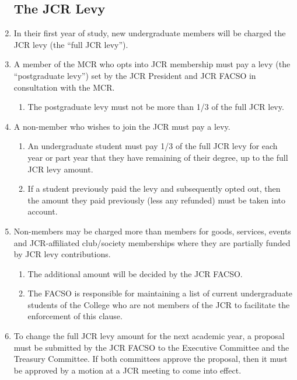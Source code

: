 \documentclass[12pt]{article}
\begin{document}
\begin{enumerate}
    \subsection{The JCR Levy}
    \item In their first year of study, new undergraduate members will be charged the JCR levy (the ``full JCR levy'').
    \item A member of the MCR who opts into JCR membership must pay a levy (the ``postgraduate levy'') set by the JCR President and JCR FACSO in consultation with the MCR.
    \begin{enumerate}
        \item The postgraduate levy must not be more than 1/3 of the full JCR levy.
    \end{enumerate}
    \item A non-member who wishes to join the JCR must pay a levy.
    \begin{enumerate}
        \item An undergraduate student must pay 1/3 of the full JCR levy for each year or part year that they have remaining of their degree, up to the full JCR levy amount.
        \item If a student previously paid the levy and subsequently opted out, then the amount they paid previously (less any refunded) must be taken into account.
    \end{enumerate}
    \item Non-members may be charged more than members for goods, services, events and JCR-affiliated club/society memberships where they are partially funded by JCR levy contributions.
    \begin{enumerate}
        \item The additional amount will be decided by the JCR FACSO.
        \item The FACSO is responsible for maintaining a list of current undergraduate students of the College who are not members of the JCR to facilitate the enforcement of this clause.
    \end{enumerate}
    \item To change the full JCR levy amount for the next academic year, a proposal must be submitted by the JCR FACSO to the Executive Committee and the Treasury Committee. If both committees approve the proposal, then it must be approved by a motion at a JCR meeting to come into effect.

\end{enumerate}
\end{document}
